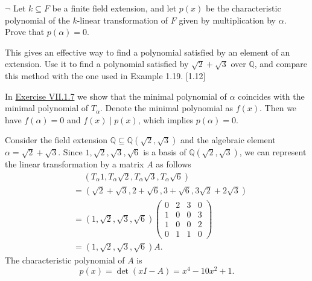 \documentclass[12pt,letterpaper,boxed]{hmcpset}
\begin{document}
\hypertarget{Exercise VII.1.11}{}
\begin{problem}[1.11]
	$\neg$ Let $k \subseteq F$ be a finite field extension, and let $p(x)$ be the characteristic polynomial of the $k$-linear transformation of $F$ given by multiplication by $\alpha$. Prove that $p(\alpha)=0$.

	\hspace{2em}This gives an effective way to find a polynomial satisfied by an element of an extension. Use it to find a polynomial satisfied by $\sqrt{2}+\sqrt{3}$ over $\mathbb{Q}$, and compare this method with the one used in Example 1.19. [1.12]
\end{problem}
\begin{solution}
	In \hyperlink{Exercise VII.1.7}{Exercise VII.1.7} we show that the minimal polynomial of $\alpha$ coincides with the minimal polynomial of $T_\alpha$. Denote the minimal polynomial as $f(x)$. Then we have $f(\alpha)=0$ and $f(x)\mid p(x)$, which implies $p(\alpha)=0$. 

	Consider the field extension $\mathbb{Q}\subseteq\mathbb{Q}(\sqrt{2},\sqrt{3})$ and the algebraic element $\alpha=\sqrt{2}+\sqrt{3}$. Since $1, \sqrt{2}, \sqrt{3}, \sqrt{6}$ is a basis of $\mathbb{Q}(\sqrt{2},\sqrt{3})$, we can represent the linear transformation by a matrix $A$ as follows
	\begin{align*}
		&\hspace{15pt}\left(T_\alpha 1,T_\alpha\sqrt{2},T_\alpha\sqrt{3},T_\alpha\sqrt{6}\right)\\
		&=\left(\sqrt{2}+\sqrt{3},2+\sqrt{6},3+\sqrt{6},3\sqrt{2}+2\sqrt{3}\right)\\
		&=\left(1,\sqrt{2},\sqrt{3},\sqrt{6}\right)
		\begin{pmatrix}
			0&2&3&0\\
			1&0&0&3\\
			1&0&0&2\\
			0&1&1&0
		\end{pmatrix}\\
		&=\left(1,\sqrt{2},\sqrt{3},\sqrt{6}\right)A.
	\end{align*}
	The characteristic polynomial of $A$ is
	\[
		p(x)=\det(xI-A)=x^4-10x^2+1.
	\]
\end{solution}
\end{document}
